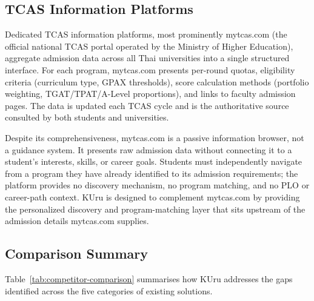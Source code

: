 \subsection{TCAS Information Platforms}
\label{subsection:tcas-platforms}

Dedicated TCAS information platforms, most prominently mytcas.com (the official national TCAS portal operated by the Ministry of Higher Education), aggregate admission data across all Thai universities into a single structured interface. For each program, mytcas.com presents per-round quotas, eligibility criteria (curriculum type, GPAX thresholds), score calculation methods (portfolio weighting, TGAT/TPAT/A-Level proportions), and links to faculty admission pages. The data is updated each TCAS cycle and is the authoritative source consulted by both students and universities.

Despite its comprehensiveness, mytcas.com is a passive information browser, not a guidance system. It presents raw admission data without connecting it to a student's interests, skills, or career goals. Students must independently navigate from a program they have already identified to its admission requirements; the platform provides no discovery mechanism, no program matching, and no PLO or career-path context. KUru is designed to complement mytcas.com by providing the personalized discovery and program-matching layer that sits upstream of the admission details mytcas.com supplies.

\subsection{Comparison Summary}
\label{subsection:comparison-summary}

Table~\ref{tab:competitor-comparison} summarises how KUru addresses the gaps identified across the five categories of existing solutions.

